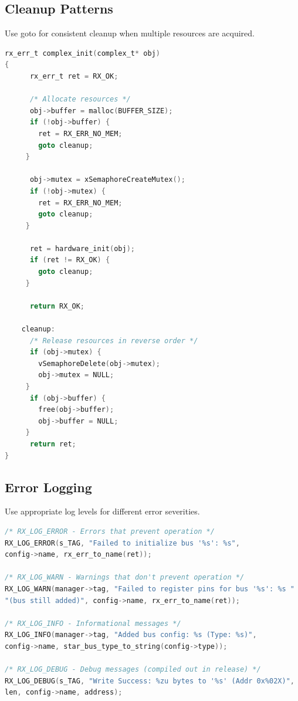 \subsection{Cleanup Patterns}

Use goto for consistent cleanup when multiple resources are acquired.

\begin{lstlisting}[language=C]
rx_err_t complex_init(complex_t* obj)
{
      rx_err_t ret = RX_OK;

      /* Allocate resources */
      obj->buffer = malloc(BUFFER_SIZE);
      if (!obj->buffer) {
        ret = RX_ERR_NO_MEM;
        goto cleanup;
     }

      obj->mutex = xSemaphoreCreateMutex();
      if (!obj->mutex) {
        ret = RX_ERR_NO_MEM;
        goto cleanup;
     }

      ret = hardware_init(obj);
      if (ret != RX_OK) {
        goto cleanup;
     }

      return RX_OK;

    cleanup:
      /* Release resources in reverse order */
      if (obj->mutex) {
        vSemaphoreDelete(obj->mutex);
        obj->mutex = NULL;
     }
      if (obj->buffer) {
        free(obj->buffer);
        obj->buffer = NULL;
     }
      return ret;
}
\end{lstlisting}

\subsection{Error Logging}

Use appropriate log levels for different error severities.

\begin{lstlisting}[language=C]
/* RX_LOG_ERROR - Errors that prevent operation */
RX_LOG_ERROR(s_TAG, "Failed to initialize bus '%s': %s",
config->name, rx_err_to_name(ret));

/* RX_LOG_WARN - Warnings that don't prevent operation */
RX_LOG_WARN(manager->tag, "Failed to register pins for bus '%s': %s "
"(bus still added)", config->name, rx_err_to_name(ret));

/* RX_LOG_INFO - Informational messages */
RX_LOG_INFO(manager->tag, "Added bus config: %s (Type: %s)",
config->name, star_bus_type_to_string(config->type));

/* RX_LOG_DEBUG - Debug messages (compiled out in release) */
RX_LOG_DEBUG(s_TAG, "Write Success: %zu bytes to '%s' (Addr 0x%02X)",
len, config->name, address);
\end{lstlisting}

